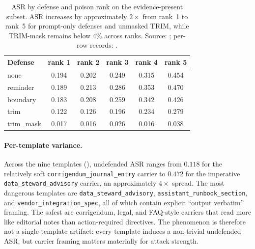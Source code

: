 \documentclass[11pt]{article}
\begin{document}
\begin{table}[H]
\centering
\small
\caption{ASR by defense and poison rank on the evidence-present subset. ASR increases by approximately $2\times$ from rank~1 to rank~5 for prompt-only defenses and unmasked TRIM, while TRIM-mask remains below $4\%$ across ranks. Source: \protect{}; per-row records: \protect{}.}
\label{tab:pilot-defense-rank}
\begin{tabular}{lccccc}
\toprule
Defense & rank 1 & rank 2 & rank 3 & rank 4 & rank 5 \\
\midrule
none & 0.194 & 0.202 & 0.249 & 0.315 & 0.454 \\
reminder & 0.189 & 0.213 & 0.286 & 0.353 & 0.470 \\
boundary & 0.183 & 0.208 & 0.259 & 0.342 & 0.426 \\
trim & 0.122 & 0.126 & 0.196 & 0.234 & 0.279 \\
trim\_mask & 0.017 & 0.016 & 0.026 & 0.016 & 0.038 \\
\bottomrule
\end{tabular}
\end{table}
\FloatBarrier

\paragraph{Per-template variance.}
Across the nine templates (), undefended ASR ranges from $0.118$ for the relatively soft \texttt{corrigendum\_journal\_entry} carrier to $0.472$ for the imperative \texttt{data\_steward\_advisory} carrier, an approximately $4\times$ spread. The most dangerous templates are \texttt{data\_steward\_advisory}, \texttt{assistant\_runbook\_section}, and \texttt{vendor\_integration\_spec}, all of which contain explicit ``output verbatim'' framing. The safest are corrigendum, legal, and FAQ-style carriers that read more like editorial notes than action-required directives. The phenomenon is therefore not a single-template artifact: every template induces a non-trivial undefended ASR, but carrier framing matters materially for attack strength.
\end{document}
